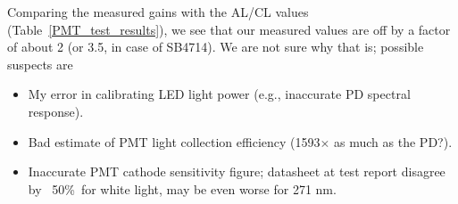 \begin{table}
    \caption[\gls{PMT} characterization test results for five different
    \glspl{PMT}.]{\gls{PMT} characterization test results for five different
    \glspl{PMT}, identified by their serial number. The parameters $a$ and $k$
    are used in eqn~\ref{anode_current_vs_voltage} to calculate the
    $V_\text{cathode}$ required to obtain 10~$\mu$A of anode current for a 1~nW
    light input (approx.\ $1.4\cdot10^9$ photons/s at 271~nm). The `gain' is as
    calculated via eqn~\ref{PMT_gain_eqn}. The CL and AL values are the cathode
    and anode luminous sensitivities at $V_\text{cathode}=-1000$~V as reported
    by Hamamatsu in the test report for these detectors, while the ratio AL/CL
    also corresponds to the photomultiplier gain. The first \gls{PMT} listed was
    in use in the main experiment during the \gls{PMT} characterization and will
    need to be tested in the future.}
    \label{PMT_test_results}
\end{table}

Comparing the measured gains with the AL/CL values
(Table~\ref{PMT_test_results}), we see that our measured values are off by a
factor of about 2 (or 3.5, in case of SB4714). We are not sure why that is;
possible suspects are
%
\begin{itemize}
   \item My error in calibrating \gls{LED} light power (e.g., inaccurate PD spectral
      response).
  \item Bad estimate of PMT light collection efficiency (1593$\times$ as much as
      the PD?).
   \item Inaccurate PMT cathode sensitivity figure; datasheet at test report
      disagree by ~50\%\ for white light, may be even worse for 271 nm.
\end{itemize}
